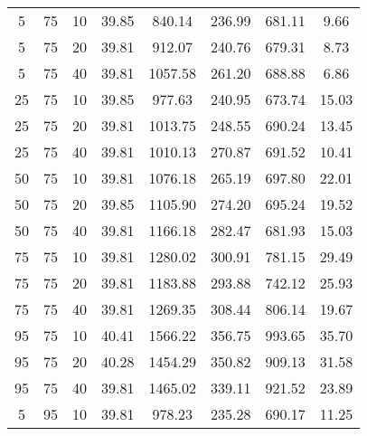 \begin{table}[h]
\begin{tabular}{ccc|c|c|c|c|c}
5 & 75 & 10 & \cellcolor{gray!50}39.85 & \cellcolor{gray!31}840.14 & \cellcolor{gray!1}236.99 & \cellcolor{gray!44}681.11 & 9.66\\
5 & 75 & 20 & \cellcolor{gray!50}39.81 & \cellcolor{gray!19}912.07 & \cellcolor{gray!1}240.76 & \cellcolor{gray!45}679.31 & 8.73\\
5 & 75 & 40 & \cellcolor{gray!50}39.81 & \cellcolor{gray!1}1057.58 & \cellcolor{gray!1}261.20 & \cellcolor{gray!42}688.88 & 6.86\\
25 & 75 & 10 & \cellcolor{gray!50}39.85 & \cellcolor{gray!8}977.63 & \cellcolor{gray!1}240.95 & \cellcolor{gray!46}673.74 & 15.03\\
25 & 75 & 20 & \cellcolor{gray!50}39.81 & \cellcolor{gray!2}1013.75 & \cellcolor{gray!1}248.55 & \cellcolor{gray!41}690.24 & 13.45\\
25 & 75 & 40 & \cellcolor{gray!50}39.81 & \cellcolor{gray!3}1010.13 & \cellcolor{gray!1}270.87 & \cellcolor{gray!41}691.52 & 10.41\\
50 & 75 & 10 & \cellcolor{gray!50}39.81 & \cellcolor{gray!1}1076.18 & \cellcolor{gray!1}265.19 & \cellcolor{gray!39}697.80 & 22.01\\
50 & 75 & 20 & \cellcolor{gray!50}39.85 & \cellcolor{gray!1}1105.90 & \cellcolor{gray!1}274.20 & \cellcolor{gray!40}695.24 & 19.52\\
50 & 75 & 40 & \cellcolor{gray!50}39.81 & \cellcolor{gray!1}1166.18 & \cellcolor{gray!1}282.47 & \cellcolor{gray!44}681.93 & 15.03\\
75 & 75 & 10 & \cellcolor{gray!50}39.81 & \cellcolor{gray!1}1280.02 & \cellcolor{gray!1}300.91 & \cellcolor{gray!13}781.15 & 29.49\\
75 & 75 & 20 & \cellcolor{gray!50}39.81 & \cellcolor{gray!1}1183.88 & \cellcolor{gray!1}293.88 & \cellcolor{gray!25}742.12 & 25.93\\
75 & 75 & 40 & \cellcolor{gray!50}39.81 & \cellcolor{gray!1}1269.35 & \cellcolor{gray!1}308.44 & \cellcolor{gray!6}806.14 & 19.67\\
95 & 75 & 10 & \cellcolor{gray!44}40.41 & \cellcolor{gray!1}1566.22 & \cellcolor{gray!1}356.75 & \cellcolor{gray!1}993.65 & 35.70\\
95 & 75 & 20 & \cellcolor{gray!46}40.28 & \cellcolor{gray!1}1454.29 & \cellcolor{gray!1}350.82 & \cellcolor{gray!1}909.13 & 31.58\\
95 & 75 & 40 & \cellcolor{gray!50}39.81 & \cellcolor{gray!1}1465.02 & \cellcolor{gray!1}339.11 & \cellcolor{gray!1}921.52 & 23.89\\
5 & 95 & 10 & \cellcolor{gray!50}39.81 & \cellcolor{gray!8}978.23 & \cellcolor{gray!1}235.28 & \cellcolor{gray!41}690.17 & 11.25\\

\end{tabular}
\end{table}
